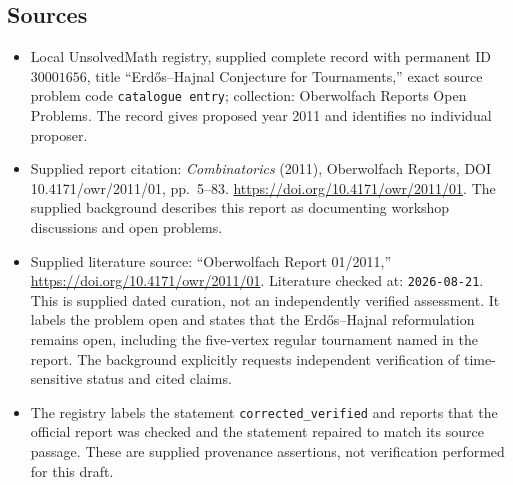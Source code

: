 \documentclass[11pt]{article}
\begin{document}
\subsection{Sources}
\begin{itemize}
\item Local UnsolvedMath registry, supplied complete record with permanent ID \(30001656\), title ``Erdős--Hajnal Conjecture for Tournaments,'' exact source problem code \texttt{catalogue entry}; collection: Oberwolfach Reports Open Problems. The record gives proposed year 2011 and identifies no individual proposer.
\item Supplied report citation: \emph{Combinatorics} (2011), Oberwolfach Reports, DOI 10.4171/owr/2011/01, pp.\ 5--83. \url{https://doi.org/10.4171/owr/2011/01}. The supplied background describes this report as documenting workshop discussions and open problems.
\item Supplied literature source: ``Oberwolfach Report 01/2011,'' \url{https://doi.org/10.4171/owr/2011/01}. Literature checked at: \texttt{2026-08-21}. This is supplied dated curation, not an independently verified assessment. It labels the problem open and states that the Erdős--Hajnal reformulation remains open, including the five-vertex regular tournament named in the report. The background explicitly requests independent verification of time-sensitive status and cited claims.
\item The registry labels the statement \texttt{corrected\_verified} and reports that the official report was checked and the statement repaired to match its source passage. These are supplied provenance assertions, not verification performed for this draft.
\end{itemize}
\end{document}
